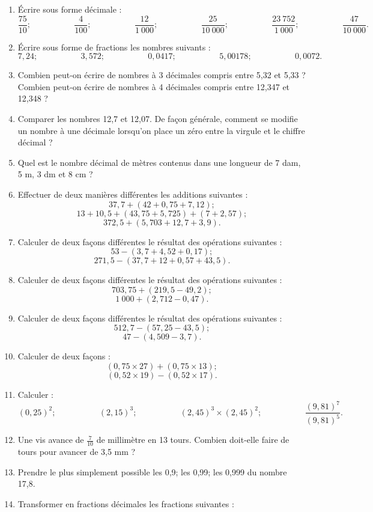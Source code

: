 \documentclass[12 pt]{report}
\theoremstyle{plain}
\newcounter{n}
\begin{document}
 \begin{enumerate}
 \item Écrire sous forme décimale : 
 \[ \frac{75}{10};\phantom{meowmeow}\frac4{100};\phantom{meowmeow}\frac{12}{1~000};\phantom{meowmeow}\frac{25}{10~000};\phantom{meowmeow}\frac{23~752}{1~000};\phantom{meowmeow}\frac{47}{10~000}.\]
 \item Écrire sous forme de fractions les nombres suivants : 
 \[7,24; \phantom{meowmeow} 3,572;\phantom{meowmeow}
 0,0417;\phantom{meowmeow}5,00178;\phantom{meowmeow}
 0,0072.\]
 \item Combien peut-on écrire de nombres à 3 décimales compris entre 5,32 et 5,33 ? Combien peut-on écrire de nombres à 4 décimales compris entre 12,347 et 12,348 ? 
 \item Comparer les nombres 12,7 et 12,07. De façon générale, comment se modifie un nombre à une décimale lorsqu'on place un zéro entre la virgule et le chiffre décimal ?
 \item Quel est le nombre décimal de mètres contenus dans une longueur de 7 dam, 5 m, 3 dm et 8 cm ? 
 \item Effectuer de deux manières différentes les additions suivantes : 
 \[ 37,7 + (42+0,75+7,12);\] 
 \[ 13 + 10,5 + ( 43, 75 + 5,725) + (7 + 2,57) ; \]
 \[ 372, 5 + ( 5,703 + 12, 7 + 3,9).\]
 \item Calculer de deux façons différentes le résultat des opérations suivantes : 
 \[ 53 - ( 3,7 + 4,52 + 0,17);\]
 \[ 271,5 - (37,7 + 12 + 0,57 + 43,5).\]
 \item Calculer de deux façons différentes le résultat des opérations suivantes : 
 \[ 703,75 + (219,5-49,2);\]
 \[1~000 + (2,712-0,47).\]
 \item Calculer de deux façons différentes le résultat des opérations suivantes : 
 \[ 512,7-(57,25-43,5);\]
 \[47-(4,509-3,7).\]
 \item Calculer de deux façons : 
 \[ (0,75\times 27) + (0,75 \times 13); \]
 \[ (0,52\times 19) - (0,52 \times 17).\]
 \item Calculer : 
 \[ (0,25)^2; \phantom{meowmeow} (2,15)^3; \phantom{meowmeow}
 (2,45)^3 \times (2,45)^2; \phantom{meowmeow}
 \frac{(9,81)^7}{(9,81)^5}.\]
 \item Une vis avance de $\frac7{10}$ de millimètre en 13 tours. Combien doit-elle faire de tours pour avancer de 3,5 mm ? 
 \item Prendre le plus simplement possible les 0,9; les 0,99; les 0,999 du nombre 17,8. 
 \item Transformer en fractions décimales les fractions suivantes : 

\end{enumerate}
\end{document}
